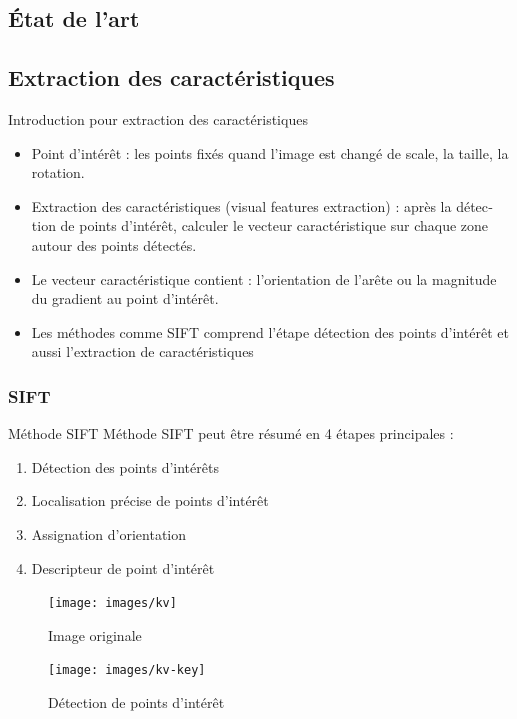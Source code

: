 \documentclass[11pt]{beamer}
\begin{document}
\begin{otherlanguage}{french}
\section{État de l'art}
\subsection{Extraction des caractéristiques}
\begin{frame}{Introduction pour extraction des caractéristiques}
\begin{itemize}
\item Point d'intérêt : les points fixés quand l'image est changé de scale, la taille, la rotation.
\item Extraction des caractéristiques (visual features extraction) : après la détection de points d'intérêt, calculer le vecteur caractéristique sur chaque zone autour des points détectés.
\item Le vecteur caractéristique contient : l'orientation de l'arête ou la magnitude du gradient au point d'intérêt.
\item Les méthodes comme SIFT comprend l'étape détection des points d'intérêt et aussi l'extraction de caractéristiques
\end{itemize}
\end{frame}

\subsubsection*{SIFT}
\begin{frame}{Méthode SIFT}
Méthode SIFT peut être résumé en 4 étapes principales :
\begin{enumerate}
\item Détection des points d'intérêts
\item Localisation précise de points d'intérêt
\item Assignation d'orientation
\item Descripteur de point d'intérêt
\end{enumerate}

\begin{figure}[!htb]
\centering
{}
\texttt{[image: images/kv]}
\caption{Image originale}
\endminipage\hfill
{}
\texttt{[image: images/kv-key]}
\caption{Détection de points d'intérêt}
\endminipage\hfill
\end{figure}


\end{frame}
\end{otherlanguage}
\end{document}
